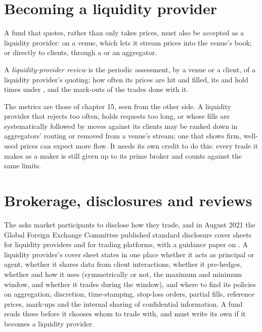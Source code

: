 \section{Becoming a liquidity provider}

A fund that quotes, rather than only takes prices, must also be accepted as a
liquidity provider: on a venue, which lets it stream prices into the venue's book; or
directly to clients, through a  or an aggregator.

\begin{definition}\label{def:m2:getting-access-fx:review}
A \emph{liquidity-provider review} is the periodic
assessment, by a venue or a client, of a liquidity provider's quoting: how often its
prices are hit and filled, its  and hold times under , and the
mark-outs of the trades done with it.
\end{definition}

The metrics are those of chapter 15, seen from the other side. A liquidity provider
that rejects too often, holds requests too long, or whose fills are systematically
followed by moves against its clients may be ranked down in aggregators' routing or
removed from a venue's stream; one that shows firm, well-used prices can expect more
flow. It needs its own credit to do this: every trade it makes as a maker is still
given up to its prime broker and counts against the same limits.

\section{Brokerage, disclosures and reviews}

The  asks market participants to disclose how they trade, and in August
2021 the Global Foreign Exchange Committee published standard disclosure cover sheets
for liquidity providers and for trading platforms, with a guidance paper on .
A liquidity provider's cover sheet states in one place whether it acts as principal or
agent, whether it shares data from client interactions, whether it pre-hedges, whether
and how it uses  (symmetrically or not, the maximum and minimum window, and
whether it trades during the window), and where to find its policies on aggregation,
discretion, time-stamping, stop-loss orders, partial fills, reference prices, mark-ups
and the internal sharing of confidential information. A fund reads these before it
chooses whom to trade with, and must write its own if it becomes a liquidity provider.

